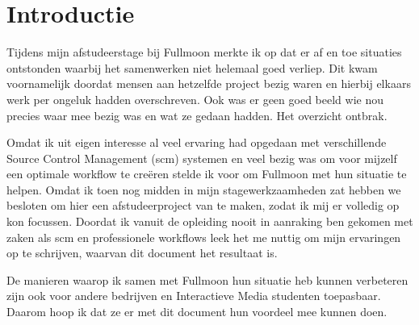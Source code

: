 \setcounter{chapter}{0}
\chapter{Introductie}
  
Tijdens mijn afstudeerstage bij Fullmoon merkte ik op dat er af en toe situaties ontstonden waarbij het samenwerken niet helemaal goed verliep. Dit kwam voornamelijk doordat mensen aan hetzelfde project bezig waren en hierbij elkaars werk per ongeluk hadden overschreven. Ook was er geen goed beeld wie nou precies waar mee bezig was en wat ze gedaan hadden. Het overzicht ontbrak.
  
Omdat ik uit eigen interesse al veel ervaring had opgedaan met verschillende Source Control Management ({\sc scm}) systemen en veel bezig was om voor mijzelf een optimale workflow te creëren stelde ik voor om Fullmoon met hun situatie te helpen. Omdat ik toen nog midden in mijn stagewerkzaamheden zat hebben we besloten om hier een afstudeerproject van te maken, zodat ik mij er volledig op kon focussen. Doordat ik vanuit de opleiding nooit in aanraking ben gekomen met zaken als {\sc scm} en professionele workflows leek het me nuttig om mijn ervaringen op te schrijven, waarvan dit document het resultaat is.

De manieren waarop ik samen met Fullmoon hun situatie heb kunnen verbeteren zijn ook voor andere bedrijven en Interactieve Media studenten toepasbaar. Daarom hoop ik dat ze er met dit document hun voordeel mee kunnen doen.
